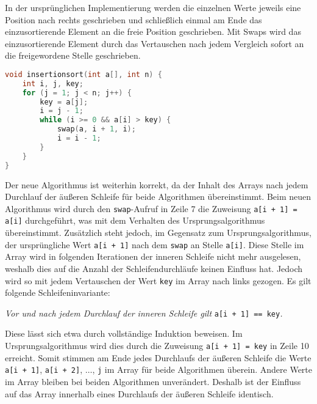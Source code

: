 \documentclass[11pt,a4paper]{article}
\begin{document}
\begin{loesung}
\begin{enumerate}
        In der ursprünglichen Implementierung werden die einzelnen Werte jeweils eine Position nach rechts geschrieben und schließlich einmal am Ende das einzusortierende Element an die freie Position geschrieben.
        Mit Swaps wird das einzusortierende Element durch das Vertauschen nach jedem Vergleich sofort an die freigewordene Stelle geschrieben.
        \begin{lstlisting}[language=c++]
void insertionsort(int a[], int n) {
    int i, j, key;
    for (j = 1; j < n; j++) {
        key = a[j];
        i = j - 1;
        while (i >= 0 && a[i] > key) {
            swap(a, i + 1, i);
            i = i - 1;
        }
    }
}
        \end{lstlisting}
        Der neue Algorithmus ist weiterhin korrekt, da der Inhalt des Arrays nach jedem Durchlauf der äußeren Schleife für beide Algorithmen übereinstimmt.
        Beim neuen Algorithmus wird durch den \texttt{swap}-Aufruf in Zeile 7 die Zuweisung \texttt{a[i + 1] = a[i]} durchgeführt, was mit dem Verhalten des Ursprungsalgorithmus übereinstimmt.
        Zusätzlich steht jedoch, im Gegensatz zum Ursprungsalgorithmus, der ursprüngliche Wert \texttt{a[i + 1]} nach dem \texttt{swap} an Stelle \texttt{a[i]}.
        Diese Stelle im Array wird in folgenden Iterationen der inneren Schleife nicht mehr ausgelesen, weshalb dies auf die Anzahl der Schleifendurchläufe keinen Einfluss hat.
        Jedoch wird so mit jedem Vertauschen der Wert \texttt{key} im Array nach links gezogen.
        Es gilt folgende Schleifeninvariante:
        \begin{center}
            \textit{Vor und nach jedem Durchlauf der inneren Schleife gilt }\texttt{a[i + 1] == key}\textit{.}
        \end{center}
        Diese lässt sich etwa durch vollständige Induktion beweisen.
        Im Ursprungsalgorithmus wird dies durch die Zuweisung \texttt{a[i + 1] = key} in Zeile 10 erreicht.
        Somit stimmen am Ende jedes Durchlaufs der äußeren Schleife die Werte \texttt{a[i + 1]}, \texttt{a[i + 2]}, $\ldots$, \texttt{j} im Array für beide Algorithmen überein.
        Andere Werte im Array bleiben bei beiden Algorithmen unverändert.
        Deshalb ist der Einfluss auf das Array innerhalb eines Durchlaufs der äußeren Schleife identisch.


\end{enumerate}
\end{loesung}
\end{document}
